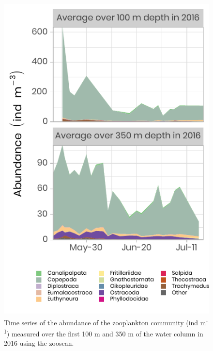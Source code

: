 \documentclass[12pt,a4paper]{scrartcl}
\begin{document}
\begin{figure}[h]
	\centering
	\includegraphics[scale = 2]{../../../graphs/fig10.pdf}
	\caption{Time series of the abundance of the zooplankton community (ind m\textsuperscript{-1}) measured over the first 100 m and 350 m of the water column in 2016 using the zooscan.}
\end{figure}
\end{document}
